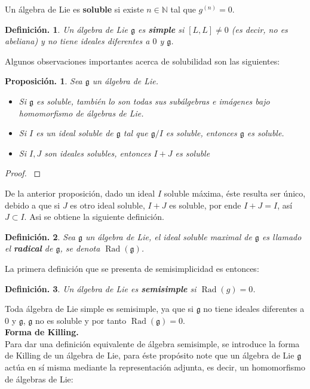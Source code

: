 \documentclass[11pt,a4paper]{article}
\newtheorem{proposition}{Proposici\'on.}
\newtheorem{definition}{Definici\'on.}
\newcommand{\Rad}{\mathop{Rad}}
\begin{document}
Un álgebra de Lie es \textbf{soluble} si existe $n\in \mathbb{N}$ tal que $g^{(n)}=0$.
\begin{definition}
Un álgebra de Lie $\mathfrak{g}$ es \textbf{simple} si $[L,L]\neq 0$ (es decir, no es abeliana) y no tiene ideales diferentes a $0$ y $\mathfrak{g}$.
\end{definition}

Algunos observaciones importantes  acerca de solubilidad son las siguientes:
\begin{proposition}
Sea $\mathfrak{g}$ un álgebra de Lie.
\begin{itemize}
    \item Si $\mathfrak{g}$ es soluble, también lo son todas sus subálgebras e imágenes bajo homomorfismo de álgebras de Lie.
    \item Si $I$ es un ideal soluble de $\mathfrak{g}$ tal que $\mathfrak{g}/I$ es soluble, entonces $\mathfrak{g}$ es soluble.
    \item Si $I,J$ son ideales solubles, entonces $I+J$ es soluble
\end{itemize}
\end{proposition}
\begin{proof}
\citep[Chap 3, Proposition 1]{humphreys2012introduction}
\end{proof}
De la anterior proposición, dado un ideal $I$ soluble máxima, éste resulta ser único, debido a que si $J$ es otro ideal soluble, $I+J$ es soluble, por ende $I+J=I$, así $J\subset I$. Asi se obtiene la siguiente definición.
\begin{definition}
Sea $\mathfrak{g}$ un álgebra de Lie, el ideal soluble maximal de $\mathfrak{g}$ es llamado el \textbf{radical} de $\mathfrak{g}$, se denota $\Rad(\mathfrak{g})$.
\end{definition}
La primera definición que se presenta de semisimplicidad es entonces:
\begin{definition}
Un álgebra de Lie es \textbf{semisimple} si $\Rad(g)=0$.
\end{definition}
Toda álgebra de Lie simple es semisimple, ya que  si $\mathfrak{g}$ no tiene ideales diferentes a $0$ y $\mathfrak{g}$, $\mathfrak{g}$ no es soluble y por tanto $\Rad(\mathfrak{g})=0$. \\
\textbf{Forma de Killing.}\\
Para dar una definición equivalente de álgebra semisimple, se introduce la forma de Killing de un álgebra de Lie, para éste propósito note que un  álgebra de Lie $\mathfrak{g}$ actúa en sí misma mediante la representación adjunta, es decir, un homomorfismo de álgebras de Lie:
\end{document}
